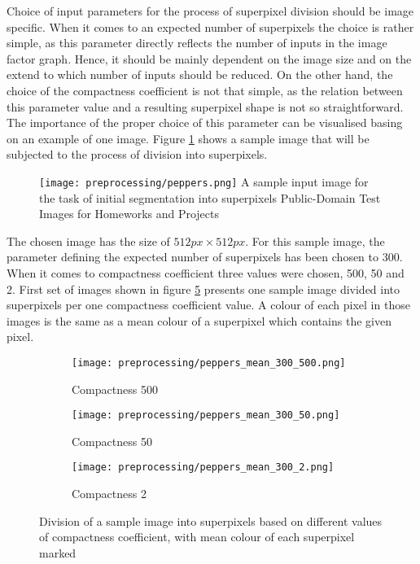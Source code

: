 Choice of input parameters for the process of superpixel division should be image specific. When it comes to an expected number of superpixels the choice is rather simple, as this parameter directly reflects the number of inputs in the image factor graph. Hence, it should be mainly dependent on the image size and on the extend to which number of inputs should be reduced. On the other hand, the choice of the compactness coefficient is not that simple, as the relation between this parameter value and a resulting superpixel shape is not so straightforward. The importance of the proper choice of this parameter can be visualised basing on an example of one image. Figure \ref{fig:peppers} shows a sample image that will be subjected to the process of division into superpixels.
\begin{figure}[ht]
    \centering
    \texttt{[image: preprocessing/peppers.png]}
    \captionsource
    {A sample input image for the task of initial segmentation into superpixels}
    {Public-Domain Test Images for Homeworks and Projects \cite{peppers}}
     \label{fig:peppers}
\end{figure}
The chosen image has the size of $512px \times 512px$. For this sample image, the parameter defining the expected number of superpixels has been chosen to $300$. When it comes to compactness coefficient three values were chosen, 500, 50 and 2. First set of images shown in figure \ref{fig:peppers_mean_colour} presents one sample image divided into superpixels per one compactness coefficient value. A colour of each pixel in those images is the same as a mean colour of a superpixel which contains the given pixel.  
\begin{figure}[ht]
 \centering
  \begin{subfigure}[h]{0.32\textwidth}
    \texttt{[image: preprocessing/peppers\_mean\_300\_500.png]}
    \caption{Compactness 500}
    \label{fig:peppers_mean_colour_500}
  \end{subfigure}
  \begin{subfigure}[h]{0.32\textwidth}
    \texttt{[image: preprocessing/peppers\_mean\_300\_50.png]}
    \caption{Compactness 50}
    \label{fig:peppers_mean_colour_50}
  \end{subfigure}
    \begin{subfigure}[h]{0.32\textwidth}
    \texttt{[image: preprocessing/peppers\_mean\_300\_2.png]}
    \caption{Compactness 2}
    \label{fig:peppers_mean_colour_2}
  \end{subfigure}
    \caption{Division of a sample image into superpixels based on different values of compactness coefficient, with mean colour of each superpixel marked}%
    \label{fig:peppers_mean_colour}
\end{figure}
